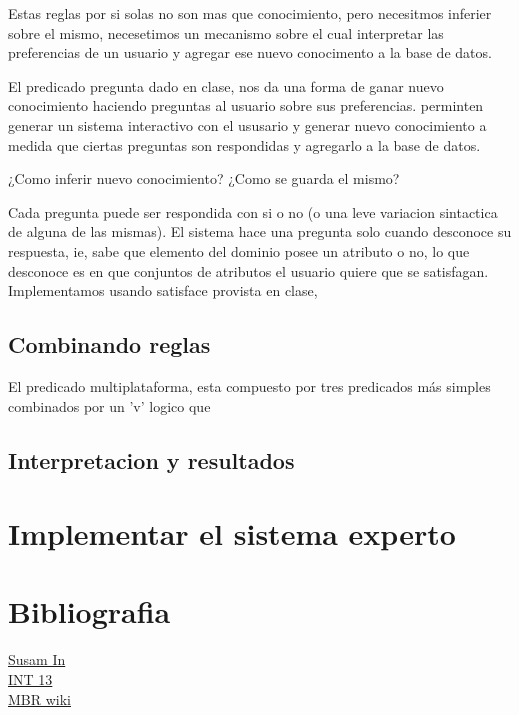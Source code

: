 \documentclass[11pt,oneside,a4paper]{article}
\begin{document}
\inputminted[firstline=1, lastline=13, fontsize=\footnotesize]{perl}{tp-prolog.pl}

Estas reglas por si solas no son mas que conocimiento, pero necesitmos inferier 
sobre el mismo, necesetimos un mecanismo sobre el cual interpretar las preferencias 
de un usuario y agregar ese nuevo conocimento a la base de datos.


El predicado pregunta dado en clase, nos da una forma de ganar nuevo conocimiento
haciendo preguntas al usuario sobre sus preferencias.
perminten generar un sistema interactivo con el ususario y generar nuevo
conocimiento a medida que ciertas preguntas son respondidas y agregarlo a
la base de datos.



¿Como inferir nuevo conocimiento? ¿Como se guarda el mismo?

Cada pregunta puede ser respondida con si o no (o una leve variacion 
sintactica de alguna de las mismas). El sistema hace una pregunta 
solo cuando desconoce su respuesta, ie, sabe que elemento del dominio 
posee un atributo o no, lo que desconoce es en que conjuntos de atributos 
el usuario quiere que se satisfagan. 
Implementamos usando satisface  %
provista en clase,%

\subsection{Combinando reglas} %


El predicado multiplataforma, esta compuesto por tres predicados más simples
combinados por un 'v' logico que 

\subsection{Interpretacion y resultados}

\section{Implementar el sistema experto}


\section*{Bibliografia}


\href{http://susam.in/articles/boot-sector-code/}{Susam In}\\
\href{http://www.pelletiernet.com/helppc/int_13-2.html}{INT 13}\\
\href{http://en.wikipedia.org/wiki/Master_boot_record}{MBR wiki}
\end{document}

